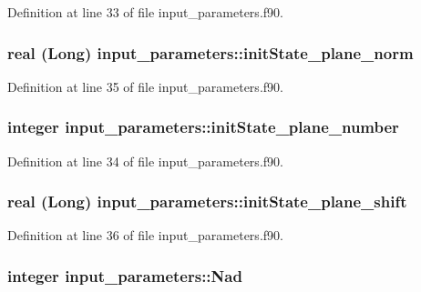 Definition at line 33 of file input\_\-parameters.f90.

\hypertarget{namespaceinput__parameters_a22ba3f1343580a0db34433e32279e365}{
\subsubsection[{initState\_\-plane\_\-norm}]{\setlength{\rightskip}{0pt plus 5cm}real (Long) {\bf input\_\-parameters::initState\_\-plane\_\-norm}}}
\label{namespaceinput__parameters_a22ba3f1343580a0db34433e32279e365}


Definition at line 35 of file input\_\-parameters.f90.

\hypertarget{namespaceinput__parameters_a876ac6edc93b733aeb66f54aca167741}{
\subsubsection[{initState\_\-plane\_\-number}]{\setlength{\rightskip}{0pt plus 5cm}integer {\bf input\_\-parameters::initState\_\-plane\_\-number}}}
\label{namespaceinput__parameters_a876ac6edc93b733aeb66f54aca167741}


Definition at line 34 of file input\_\-parameters.f90.

\hypertarget{namespaceinput__parameters_a97253a3c66d919b8a99dd33c633d3bd8}{
\subsubsection[{initState\_\-plane\_\-shift}]{\setlength{\rightskip}{0pt plus 5cm}real (Long) {\bf input\_\-parameters::initState\_\-plane\_\-shift}}}
\label{namespaceinput__parameters_a97253a3c66d919b8a99dd33c633d3bd8}


Definition at line 36 of file input\_\-parameters.f90.

\hypertarget{namespaceinput__parameters_a6e8306262594749651ff9230cb525363}{
\subsubsection[{Nad}]{\setlength{\rightskip}{0pt plus 5cm}integer {\bf input\_\-parameters::Nad}}}
\label{namespaceinput__parameters_a6e8306262594749651ff9230cb525363}


